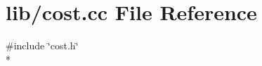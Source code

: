 \section{lib/cost.cc File Reference}
\label{lib_2cost_8cc}
{\ttfamily \#include \char`\"{}cost.\-h\char`\"{}}\\*

